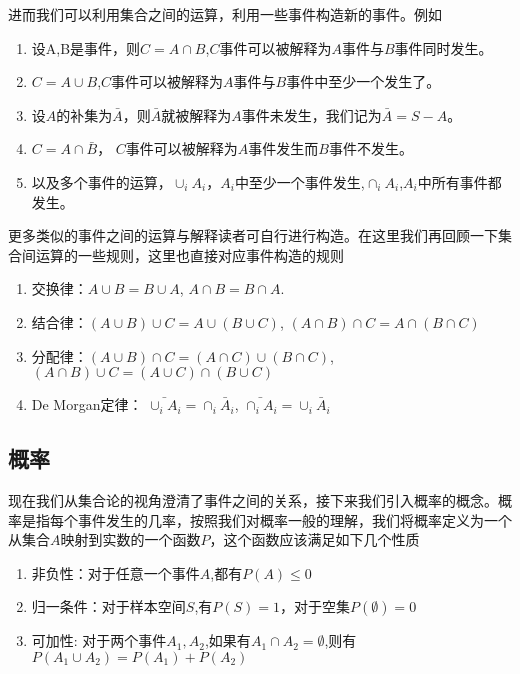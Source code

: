 进而我们可以利用集合之间的运算，利用一些事件构造新的事件。例如
\begin{enumerate}
\item 设A,B是事件，则$C = A \cap B$,$C$事件可以被解释为$A$事件与$B$事件同时发生。
\item $C = A \cup B$,$C$事件可以被解释为$A$事件与$B$事件中至少一个发生了。
\item 设$A$的补集为$\bar{A}$，则$\bar{A}$就被解释为$A$事件未发生，我们记为$\bar{A}=S-A$。
\item $C = A \cap \bar{B}$， $C$事件可以被解释为$A$事件发生而$B$事件不发生。
\item 以及多个事件的运算，$\cup_i A_i$，$A_i$中至少一个事件发生,$\cap_i A_i$,$A_i$中所有事件都发生。
\end{enumerate}
更多类似的事件之间的运算与解释读者可自行进行构造。在这里我们再回顾一下集合间运算的一些规则，这里也直接对应事件构造的规则
\begin{enumerate}
\item 交换律：$A \cup B = B \cup A$, $A \cap B = B \cap A$.
\item 结合律：$(A \cup B)\cup C = A \cup (B \cup C)$, $(A \cap B)\cap C = A \cap (B\cap C)$
\item 分配律：$(A\cup B)\cap C = (A \cap C) \cup (B \cap C)$, $(A\cap B) \cup C = (A \cup C)\cap (B \cup C)$
\item De Morgan定律： $\bar{\cup_i A_i} = \cap_i \bar{A}_i$, $\bar{\cap_i A_i} = \cup_i \bar{A}_i$
\end{enumerate}
\subsection{概率}
现在我们从集合论的视角澄清了事件之间的关系，接下来我们引入概率的概念。概率是指每个事件发生的几率，按照我们对概率一般的理解，我们将概率定义为一个从集合$A$映射到实数的一个函数$P$，这个函数应该满足如下几个性质
\begin{enumerate}
\item 非负性：对于任意一个事件$A$,都有$P(A)\leq 0$
\item 归一条件：对于样本空间$S$,有$P(S) = 1$，对于空集$P(\emptyset) = 0$
\item 可加性: 对于两个事件$A_1,A_2$,如果有$A_1 \cap A_2 = \emptyset$,则有 $P(A_1 \cup A_2) = P(A_1)+P(A_2)$
\end{enumerate}



